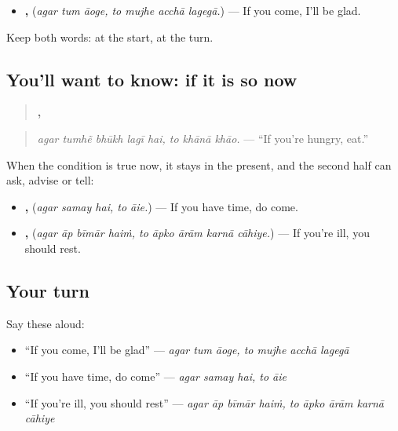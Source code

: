 \begin{itemize}
\raggedright
  \item \textbf{  ,    } (\emph{agar tum āoge, to mujhe acchā lagegā.}) — If you come, I'll be glad.
\end{itemize}

Keep both words: \textbf{} at the start, \textbf{} at the turn.

\subsection*{You'll want to know: if it is so now}
\begin{quote}
\textbf{    ,   }
\end{quote}

\begin{quote}
\emph{agar tumhẽ bhūkh lagī hai, to khānā khāo.} — \textquotedblleft{}If you're hungry, eat.\textquotedblright{}
\end{quote}

When the condition is true now, it stays in the present, and the second half can ask, advise or tell:

\begin{itemize}
\raggedright
  \item \textbf{  ,  } (\emph{agar samay hai, to āie.}) — If you have time, do come.
  \item \textbf{   ,     } (\emph{agar āp bīmār haiṁ, to āpko ārām karnā cāhiye.}) — If you're ill, you should rest.
\end{itemize}

\subsection*{Your turn}
Say these aloud:

\begin{itemize}
\raggedright
  \item \textquotedblleft{}If you come, I'll be glad\textquotedblright{} — \emph{agar tum āoge, to mujhe acchā lagegā}
  \item \textquotedblleft{}If you have time, do come\textquotedblright{} — \emph{agar samay hai, to āie}
  \item \textquotedblleft{}If you're ill, you should rest\textquotedblright{} — \emph{agar āp bīmār haiṁ, to āpko ārām karnā cāhiye}
\end{itemize}

